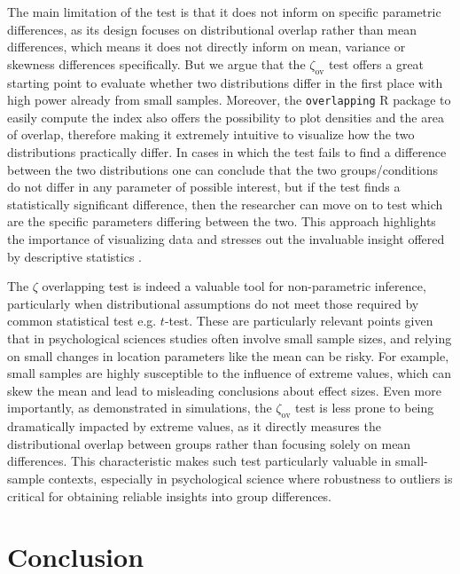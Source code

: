 \documentclass[twocolumn]{article}\usepackage[]{graphicx}\usepackage[]{xcolor}
\begin{document}
The main limitation of the test is that it does not inform on specific parametric differences, as its design focuses on distributional overlap rather than mean differences, which means it does not directly inform on mean, variance or skewness differences specifically. But we argue that the $\zeta_{\mbox{ov}}$ test offers a great starting point to evaluate whether two distributions differ in the first place with high power already from small samples. Moreover, the \texttt{overlapping} R package to easily compute the index also offers the possibility to plot densities and the area of overlap, therefore making it extremely intuitive to visualize how the two distributions practically differ. In cases in which the test fails to find a difference between the two distributions one can conclude that the two groups/conditions do not differ in any parameter of possible interest, but if the test finds a statistically significant difference, then the researcher can move on to test which are the specific parameters differing between the two. This approach highlights the importance of visualizing data and stresses out the invaluable insight offered by descriptive statistics \cite{wilkinson1999statistical, tay2016graphical, pastore2017one}.

The $\zeta$ overlapping test is indeed a valuable tool for non-parametric inference, particularly when distributional assumptions do not meet those required by common statistical test e.g. $t$-test. These are particularly relevant points given that in psychological sciences studies often involve small sample sizes, and relying on small changes in location parameters like the mean can be risky. For example, small samples are highly susceptible to the influence of extreme values, which can skew the mean and lead to misleading conclusions about effect sizes. Even more importantly, as demonstrated in simulations, the $\zeta_{\mbox{ov}}$ test is less prone to being dramatically impacted by extreme values, as it directly measures the distributional overlap between groups rather than focusing solely on mean differences. This characteristic makes such test particularly valuable in small-sample contexts, especially in psychological science where robustness to outliers is critical for obtaining reliable insights into group differences.

\section{Conclusion}
\end{document}

